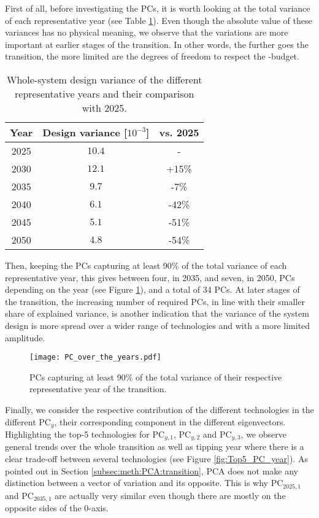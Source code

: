 First of all, before investigating the \gls{PCs}, it is worth looking at the total variance of each representative year (see Table \ref{tab:design_variance}). Even though the absolute value of these variances has no physical meaning, we observe that the variations are more important at earlier stages of the transition. In other words, the further goes the transition, the more limited are the degrees of freedom to respect the -budget.

\begin{table}[htbp]
\caption{Whole-system design variance of the different representative years and their comparison with 2025.} 
\label{tab:design_variance}
\centering
\begin{tabular}{c c c}
\toprule
\textbf{Year}      & \textbf{Design variance} [$10^{-3}$]	 &	\textbf{vs. 2025}\\
\midrule
2025 	&	$10.4$	& - 	\\
2030 	&	$12.1$	& +15\%	\\
2035 	&	$9.7$	& -7\% 	\\
2040 	&	$6.1$	& -42\% 	\\
2045 	&	$5.1$	& -51\% 	\\
2050 	&	$4.8$	& -54\% 	\\
\bottomrule
\end{tabular}
\end{table}

Then, keeping the \gls{PCs} capturing at least 90\% of the total variance of each representative year, this gives between four, in 2035, and seven, in 2050, \gls{PCs} depending on the year (see Figure \ref{fig:PC_over_the_years}), and a total of 34 \gls{PCs}. At later stages of the transition, the increasing number of required \gls{PCs}, in line with their smaller share of explained variance, is another indication that the variance of the system design is more spread over a wider range of technologies and with a more limited amplitude. 

\begin{figure}[!htbp]
\centering
\texttt{[image: PC\_over\_the\_years.pdf]}
\caption{\gls{PCs} capturing at least 90\% of the total variance of their respective representative year of the transition. }
\label{fig:PC_over_the_years}
\end{figure}

Finally, we consider the respective contribution of the different technologies in the different $\text{PC}_{y}$, \ie their corresponding component in the different eigenvectors. Highlighting the top-5 technologies for $\text{PC}_{y,1}$, $\text{PC}_{y,2}$ and $\text{PC}_{y,3}$, we observe general trends over the whole transition as well as tipping year where there is a clear trade-off between several technologies (see Figure \ref{fig:Top5_PC_year}). As pointed out in Section \ref{subsec:meth:PCA:transition}, \gls{PCA} does not make any distinction between a vector of variation and its opposite. This is why $\text{PC}_{2025,1}$ and $\text{PC}_{2035,1}$ are actually very similar even though there are mostly on the opposite sides of the 0-axis.

